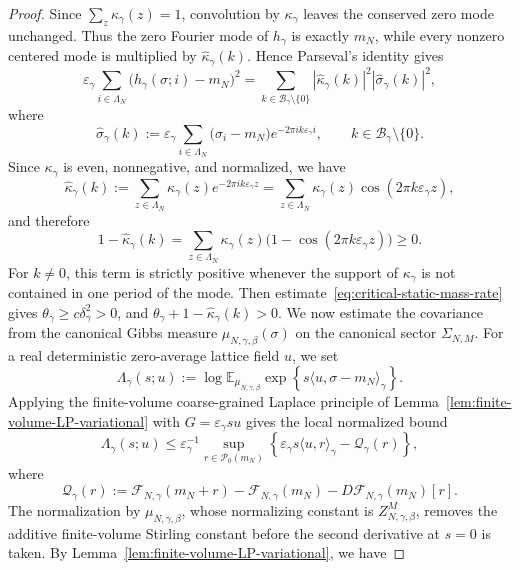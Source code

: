 \documentclass{article}
\begin{document}
\begin{proof}
Since \(\sum_z\kappa_\gamma(z)=1\), convolution by \(\kappa_\gamma\) leaves
the conserved zero mode unchanged.  
Thus the zero Fourier mode of
\(h_\gamma\) is exactly \(m_N\), while every nonzero centered mode is
multiplied by \(\widehat\kappa_\gamma(k)\).  Hence Parseval's identity gives
\begin{equation}\label{eq:Parsevalidentity}
    \varepsilon_\gamma
\sum_{i\in\Lambda_N}
\bigl(h_\gamma(\sigma;i)-m_N\bigr)^2 = \sum_{k\in\mathcal B_\gamma\setminus\{0\}}
\left|\widehat\kappa_\gamma(k)\right|^2\left|\widehat\sigma_\gamma(k)\right|^2,
\end{equation}
where
\[
\widehat\sigma_\gamma(k)
:=
\varepsilon_\gamma
\sum_{i\in\Lambda_N}
\bigl(\sigma_i-m_N\bigr)e^{-2\pi i k\varepsilon_\gamma i},
\qquad
k\in\mathcal B_\gamma\setminus\{0\}.
\]
Since
\(\kappa_\gamma\) is even, nonnegative, and normalized, we have
\[
\widehat\kappa_\gamma(k) :=
\sum_{z\in\Lambda_N}\kappa_\gamma(z)
e^{-2\pi i k\varepsilon_\gamma z}
= \sum_{z\in\Lambda_N}
\kappa_\gamma(z)\cos(2\pi k\varepsilon_\gamma z),
\]
and therefore
\[
1-\widehat\kappa_\gamma(k)
=
\sum_{z\in\Lambda_N}
\kappa_\gamma(z)
\bigl(1-\cos(2\pi k\varepsilon_\gamma z)\bigr)
\ge0.
\]
For \(k\ne0\), this term is strictly positive whenever the support of
\(\kappa_\gamma\) is not contained in one period of the mode.  
Then estimate~\ref{eq:critical-static-mass-rate} gives
\(\theta_\gamma\ge c\delta_\gamma^2>0\), and 
\(
\theta_\gamma+1-\widehat\kappa_\gamma(k)>0.
\)
We now estimate the covariance from the canonical Gibbs measure $\mu_{N,\gamma,\beta}(\sigma)$ on the canonical sector $\Sigma_{N,M}$.
For a real deterministic zero-average lattice field \(u\), we set
\[
\Lambda_\gamma(s;u)
:=
\log
\mathbb E_{\mu_{N,\gamma,\beta}}
\exp\left\{
s\langle u,\sigma-m_N\rangle_\gamma
\right\}.
\]
Applying the finite-volume coarse-grained Laplace principle of
Lemma~\ref{lem:finite-volume-LP-variational} with \(G=\varepsilon_\gamma s u\)
gives the local normalized bound
\[
\Lambda_\gamma(s;u)
\le
\varepsilon_\gamma^{-1}
\sup_{r\in\mathcal P_0(m_N)}
\left\{
\varepsilon_\gamma s\langle u,r\rangle_\gamma
-
\mathcal Q_\gamma(r)
\right\},
\]
where
\[
\mathcal Q_\gamma(r)
:=
\mathcal F_{N,\gamma}(m_N+r)
-
\mathcal F_{N,\gamma}(m_N)
-
D\mathcal F_{N,\gamma}(m_N)[r].
\]
The normalization by \(\mu_{N,\gamma,\beta}\), whose normalizing constant is
\(Z_{N,\gamma,\beta}^{M}\), removes the additive finite-volume Stirling
constant before the second derivative at \(s=0\) is taken.
By Lemma~\ref{lem:finite-volume-LP-variational}, we have

\end{proof}
\end{document}
